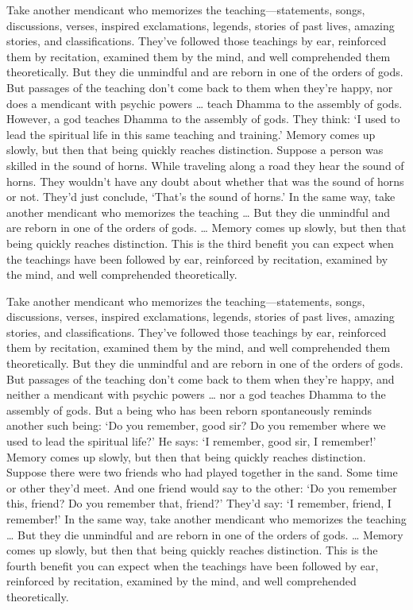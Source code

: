 \documentclass[12pt,openany]{book}%
\begin{document}
Take another mendicant who memorizes the teaching—statements, songs, discussions, verses, inspired exclamations, legends, stories of past lives, amazing stories, and classifications. They’ve followed those teachings by ear, reinforced them by recitation, examined them by the mind, and well comprehended them theoretically. But they die unmindful and are reborn in one of the orders of gods. But passages of the teaching don’t come back to them when they’re happy, nor does a mendicant with psychic powers … teach Dhamma to the assembly of gods. However, a god teaches Dhamma to the assembly of gods. They think: ‘I used to lead the spiritual life in this same teaching and training.’ Memory comes up slowly, but then that being quickly reaches distinction. Suppose a person was skilled in the sound of horns. While traveling along a road they hear the sound of horns. They wouldn’t have any doubt about whether that was the sound of horns or not. They’d just conclude, ‘That’s the sound of horns.’ In the same way, take another mendicant who memorizes the teaching … But they die unmindful and are reborn in one of the orders of gods. … Memory comes up slowly, but then that being quickly reaches distinction. This is the third benefit you can expect when the teachings have been followed by ear, reinforced by recitation, examined by the mind, and well comprehended theoretically. 

Take another mendicant who memorizes the teaching—statements, songs, discussions, verses, inspired exclamations, legends, stories of past lives, amazing stories, and classifications. They’ve followed those teachings by ear, reinforced them by recitation, examined them by the mind, and well comprehended them theoretically. But they die unmindful and are reborn in one of the orders of gods. But passages of the teaching don’t come back to them when they’re happy, and neither a mendicant with psychic powers … nor a god teaches Dhamma to the assembly of gods. But a being who has been reborn spontaneously reminds another such being: ‘Do you remember, good sir? Do you remember where we used to lead the spiritual life?’ He says: ‘I remember, good sir, I remember!’ Memory comes up slowly, but then that being quickly reaches distinction. Suppose there were two friends who had played together in the sand. Some time or other they’d meet. And one friend would say to the other: ‘Do you remember this, friend? Do you remember that, friend?’ They’d say: ‘I remember, friend, I remember!’ In the same way, take another mendicant who memorizes the teaching … But they die unmindful and are reborn in one of the orders of gods. … Memory comes up slowly, but then that being quickly reaches distinction. This is the fourth benefit you can expect when the teachings have been followed by ear, reinforced by recitation, examined by the mind, and well comprehended theoretically. 
\end{document}
